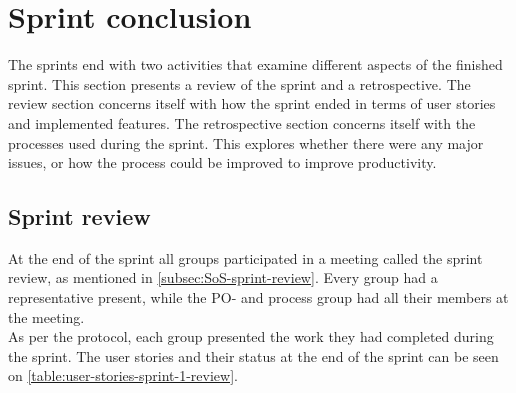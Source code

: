 \section{Sprint conclusion}
The sprints end with two activities that examine different aspects of the finished sprint.
This section presents a review of the sprint and a retrospective.
The review section concerns itself with how the sprint ended in terms of user stories and implemented features.
The retrospective section concerns itself with the processes used during the sprint.
This explores whether there were any major issues, or how the process could be improved to improve productivity.

\subsection{Sprint review}
At the end of the sprint all groups participated in a meeting called the sprint review, as mentioned in \autoref{subsec:SoS-sprint-review}.
Every group had a representative present, while the PO- and process group had all their members at the meeting.
\\
As per the protocol, each group presented the work they had completed during the sprint. The user stories and their status at the end of the sprint can be seen on \autoref{table:user-stories-sprint-1-review}.


